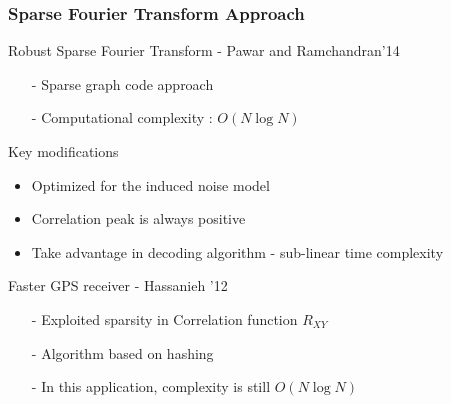 \documentclass[10pt,xcolor=table]{beamer}
\begin{document}
\begin{frame}\frametitle{Sparse Fourier Transform Approach}
        \begin{block}{Robust Sparse Fourier Transform - Pawar and Ramchandran'14}
	 		\begin{itemize}
	 			\item[-] Sparse graph code approach
	 			\item[-] Computational complexity : $O(N \log N)$
	 		\end{itemize}
	 	\end{block}
\pause
\begin{block}{Key modifications}
   \begin{itemize}
   	\item Optimized for the induced noise model
   	\item Correlation peak is always {\color{blue} positive}
   	\item Take advantage in decoding algorithm - {\color{blue}sub-linear} time complexity
   \end{itemize}
\end{block}
\pause
        \begin{block}{Faster GPS receiver - Hassanieh '12}
	 		\begin{itemize}
	 			\item[-] Exploited sparsity in Correlation function $R_{XY}$
                \item[-] Algorithm based on hashing
                \item[-] In this application, complexity is still $O(N \log N)$
	 		\end{itemize}		
	 	\end{block}	 	


\end{frame}
\end{document}
